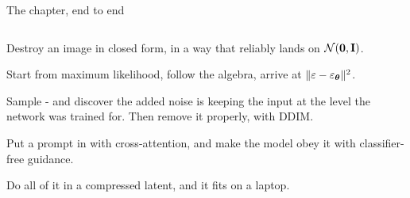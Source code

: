 \documentclass[aspectratio=169]{beamer}
\begin{document}
\begin{frame}{The chapter, end to end}
  \small
  \begin{columns}[T]
    \begin{description}\footnotesize\setlength\itemsep{3pt}
      \item[L27] Destroy an image in closed form, in a way that reliably lands on
        $\mathcal{N}(\mathbf{0},\mathbf{I})$.
      \item[L28] Start from maximum likelihood, follow the algebra, arrive at
        $\|\varepsilon-\varepsilon_{\bm{\theta}}\|^2$.
      \item[L29] Sample - and discover the added noise is keeping the input at the level
        the network was trained for. Then remove it properly, with DDIM.
      \item[L30] Put a prompt in with cross-attention, and make the model obey it with
        classifier-free guidance.
      \item[L31] Do all of it in a compressed latent, and it fits on a laptop.
    \end{description}
    \vskip 6pt
    \vskip 6pt
  \end{columns}
\end{frame}
\end{document}
